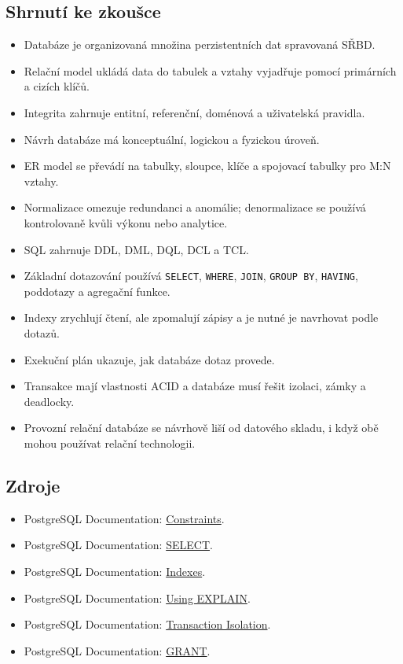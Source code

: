 \subsection{Shrnutí ke zkoušce}
\begin{itemize}
  \item Databáze je organizovaná množina perzistentních dat spravovaná SŘBD.
  \item Relační model ukládá data do tabulek a vztahy vyjadřuje pomocí primárních a cizích klíčů.
  \item Integrita zahrnuje entitní, referenční, doménová a uživatelská pravidla.
  \item Návrh databáze má konceptuální, logickou a fyzickou úroveň.
  \item ER model se převádí na tabulky, sloupce, klíče a spojovací tabulky pro M:N vztahy.
  \item Normalizace omezuje redundanci a anomálie; denormalizace se používá kontrolovaně kvůli výkonu
  nebo analytice.
  \item SQL zahrnuje DDL, DML, DQL, DCL a TCL.
  \item Základní dotazování používá \texttt{SELECT}, \texttt{WHERE}, \texttt{JOIN}, \texttt{GROUP BY},
  \texttt{HAVING}, poddotazy a agregační funkce.
  \item Indexy zrychlují čtení, ale zpomalují zápisy a je nutné je navrhovat podle dotazů.
  \item Exekuční plán ukazuje, jak databáze dotaz provede.
  \item Transakce mají vlastnosti ACID a databáze musí řešit izolaci, zámky a deadlocky.
  \item Provozní relační databáze se návrhově liší od datového skladu, i když obě mohou používat
  relační technologii.
\end{itemize}

\subsection{Zdroje}
\begin{itemize}
  \item PostgreSQL Documentation: \href{https://www.postgresql.org/docs/current/ddl-constraints.html}{Constraints}.
  \item PostgreSQL Documentation: \href{https://www.postgresql.org/docs/current/sql-select.html}{SELECT}.
  \item PostgreSQL Documentation: \href{https://www.postgresql.org/docs/current/indexes.html}{Indexes}.
  \item PostgreSQL Documentation: \href{https://www.postgresql.org/docs/current/using-explain.html}{Using EXPLAIN}.
  \item PostgreSQL Documentation: \href{https://www.postgresql.org/docs/current/transaction-iso.html}{Transaction Isolation}.
  \item PostgreSQL Documentation: \href{https://www.postgresql.org/docs/current/sql-grant.html}{GRANT}.
\end{itemize}

\newpage
